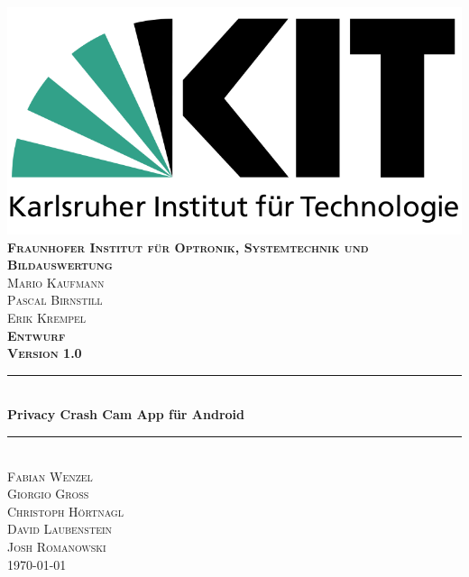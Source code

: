 \begin{titlepage}

\begin{center}

\includegraphics[width=0.5\linewidth]{resources/KITLogo.png}\\[0.5cm]
  

\textsc{\bfseries Fraunhofer Institut für Optronik, Systemtechnik und Bildauswertung}\\[0.5cm]
\textsc{Mario Kaufmann\\Pascal Birnstill\\Erik Krempel}\\[2cm]

\textsc{\LARGE \bfseries Entwurf}\\[0.5cm]
\textsc{\bfseries Version 1.0}\\[0.2cm]


\newcommand{\HRule}{\rule{\linewidth}{0.5mm}} 
{\color{mintgreen}\HRule} \\[0.4cm]
{\huge \bfseries Privacy Crash Cam App für Android}\\[0.4cm]
{\color{mintgreen}\HRule} \\[1cm]

\textsc{\Large Fabian Wenzel\\ Giorgio Groß\\ Christoph Hörtnagl\\ David Laubenstein\\[0.15cm]Josh Romanowski} \\[2cm]

{\large \today}

\end{center}

\end{titlepage}